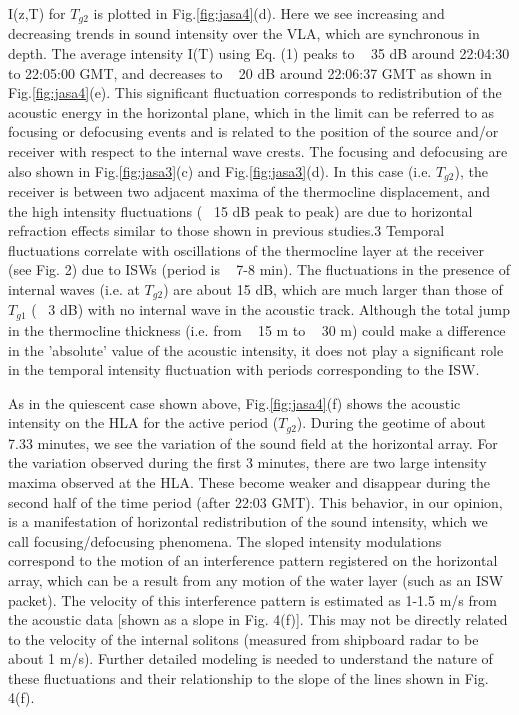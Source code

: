I(z,T) for $T_{g2}$ is plotted in Fig.\ref{fig:jasa4}(d). Here we see increasing and
decreasing trends in sound intensity over the VLA, which are
synchronous in depth. The average intensity I(T) using Eq. (1) peaks
to ~ 35 dB around 22:04:30 to 22:05:00 GMT, and decreases to ~ 20 dB
around 22:06:37 GMT as shown in Fig.\ref{fig:jasa4}(e). This significant
fluctuation corresponds to redistribution of the acoustic energy in
the horizontal plane, which in the limit can be referred to as
focusing or defocusing events and is related to the position of the
source and/or receiver with respect to the internal wave crests. The
focusing and defocusing are also shown in Fig.\ref{fig:jasa3}(c) and Fig.\ref{fig:jasa3}(d). In
this case (i.e. $T_{g2}$), the receiver is between two adjacent maxima of
the thermocline displacement, and the high intensity fluctuations (~
15 dB peak to peak) are due to horizontal refraction effects similar
to those shown in previous studies.3 Temporal fluctuations correlate
with oscillations of the thermocline layer at the receiver (see Fig.
2) due to ISWs (period is ~ 7-8 min). The fluctuations in the
presence of internal waves (i.e. at $T_{g2}$) are about 15 dB, which are
much larger than those of $T_{g1}$ (~ 3 dB) with no internal wave in the
acoustic track. Although the total jump in the thermocline thickness
(i.e. from ~ 15 m to ~ 30 m) could make a difference in the
'absolute' value of the acoustic intensity, it does not play a
significant role in the temporal intensity fluctuation with periods
corresponding to the ISW.

As in the quiescent case shown above, Fig.\ref{fig:jasa4}(f) shows the acoustic
intensity on the HLA for the active period ($T_{g2}$). During the geotime
of about 7.33 minutes, we see the variation of the sound field at
the horizontal array. For the variation observed during the first 3
minutes, there are two large intensity maxima observed at the HLA.
These become weaker and disappear during the second half of the time
period (after 22:03 GMT). This behavior, in our opinion, is a
manifestation of horizontal redistribution of the sound intensity,
which we call focusing/defocusing phenomena. The sloped intensity
modulations correspond to the motion of an interference pattern
registered on the horizontal array, which can be a result from any
motion of the water layer (such as an ISW packet). The velocity of
this interference pattern is estimated as 1-1.5 m/s from the
acoustic data [shown as a slope in Fig. 4(f)]. This may not be
directly related to the velocity of the internal solitons (measured
from shipboard radar to be about 1 m/s). Further detailed modeling
is needed to understand the nature of these fluctuations and their
relationship to the slope of the lines shown in Fig. 4(f).


